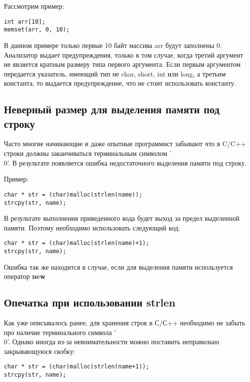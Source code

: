 Рассмотрим пример:
\begin{lstlisting}
int arr[10];
memset(arr, 0, 10);
\end{lstlisting}
В данном примере только первые 10 байт массива arr будут заполнены 0. Анализатор выдает предупреждения, 
только в том случае, когда третий аргумент не является кратным размеру типа первого аргумента. 
Если первым аргументом передается указатель, имеющий тип не char, short, int или long, а третьим константа, то
выдается предупреждение, что не стоит использовать константу.

\subsection{Неверный размер для выделения памяти под строку}
\label{sec:allocStr}
Часто многие начинающие и даже опытные программист забывают что в C/C++ строки должны заканчиваться
терминальным символом '\\0'. В результате появляется ошибка недостаточного выделения памяти под строку.

Пример:
\begin{lstlisting}
char * str = (char)malloc(strlen(name));
strcpy(str, name);
\end{lstlisting}

В результате выполнения приведенного кода будет выход за предел выделенной памяти. Поэтому необходимо
использовать следующий код:
\begin{lstlisting}
char * str = (char)malloc(strlen(name)+1);
strcpy(str, name);
\end{lstlisting}

Ошибка так же находится в случае, если для выделения памяти используется оператор \textbf{new}

\subsection{Опечатка при использовании strlen}
\label{sec:strlen}
Как уже описывалось ранее, для хранения строк в С/С++ необходимо не забыть про наличие терминального
символа '\\0'. Однако иногда из-за невнимательности можно поставить неправильно закрывающуюся скобку:
\begin{lstlisting}
char * str = (char)malloc(strlen(name+1));
strcpy(str, name);
\end{lstlisting}

